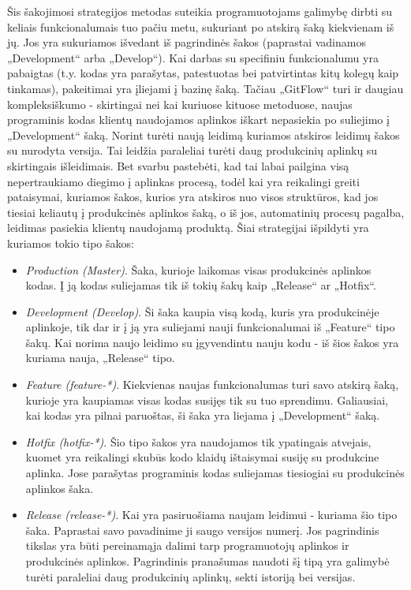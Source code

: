 \documentclass{VUMIFPSkursinis}
\begin{document}

Šis šakojimosi strategijos metodas suteikia programuotojams galimybę dirbti su keliais funkcionalumais tuo pačiu metu, sukuriant po atskirą šaką kiekvienam iš jų. Jos yra sukuriamos išvedant iš pagrindinės šakos (paprastai vadinamos „Development“ arba „Develop“). Kai darbas su specifiniu funkcionalumu yra pabaigtas (t.y. kodas yra parašytas, patestuotas bei patvirtintas kitų kolegų kaip tinkamas), pakeitimai yra įliejami į bazinę šaką. Tačiau „GitFlow“ turi ir daugiau kompleksiškumo - skirtingai nei kai kuriuose kituose metoduose, naujas programinis kodas klientų naudojamos aplinkos iškart nepasiekia po suliejimo į „Development“ šaką. Norint turėti naują leidimą kuriamos atskiros leidimų šakos su nurodyta versija. Tai leidžia paraleliai turėti daug produkcinių aplinkų su skirtingais išleidimais. Bet svarbu pastebėti, kad tai labai pailgina visą nepertraukiamo diegimo į aplinkas procesą, todėl kai yra reikalingi greiti pataisymai, kuriamos šakos, kurios yra atskiros nuo visos struktūros, kad jos tiesiai keliautų į produkcinės aplinkos šaką, o iš jos, automatinių procesų pagalba, leidimas pasiekia klientų naudojamą produktą. Šiai strategijai išpildyti yra kuriamos tokio tipo šakos:

\begin{itemize}
  \item \textit{Production (Master)}. Šaka, kurioje laikomas visas produkcinės aplinkos kodas. Į ją kodas suliejamas tik iš tokių šakų kaip „Release“ ar „Hotfix“.
  
  \item \textit{Development (Develop)}. Ši šaka kaupia visą kodą, kuris yra produkcinėje aplinkoje, tik dar ir į ją yra suliejami nauji funkcionalumai iš „Feature“ tipo šakų. Kai norima naujo leidimo su įgyvendintu nauju kodu - iš šios šakos yra kuriama nauja, „Release“ tipo.

  \item \textit{Feature (feature-*)}. Kiekvienas naujas funkcionalumas turi savo atskirą šaką, kurioje yra kaupiamas visas kodas susijęs tik su tuo sprendimu. Galiausiai, kai kodas yra pilnai paruoštas, ši šaka yra liejama į „Development“ šaką.

  \item \textit{Hotfix (hotfix-*)}. Šio tipo šakos yra naudojamos tik ypatingais atvejais, kuomet yra reikalingi skubūs kodo klaidų ištaisymai susiję su produkcine aplinka. Jose parašytas programinis kodas suliejamas tiesiogiai su produkcinės aplinkos šaka.

  
  \item \textit{Release (release-*)}. Kai yra pasiruošiama naujam leidimui - kuriama šio tipo šaka. Paprastai savo pavadinime ji saugo versijos numerį. Jos pagrindinis tikslas yra būti pereinamąja dalimi tarp programuotojų aplinkos ir produkcinės aplinkos. Pagrindinis pranašumas naudoti šį tipą yra galimybė turėti paraleliai daug produkcinių aplinkų, sekti istoriją bei versijas.
\end{itemize}
\end{document}
